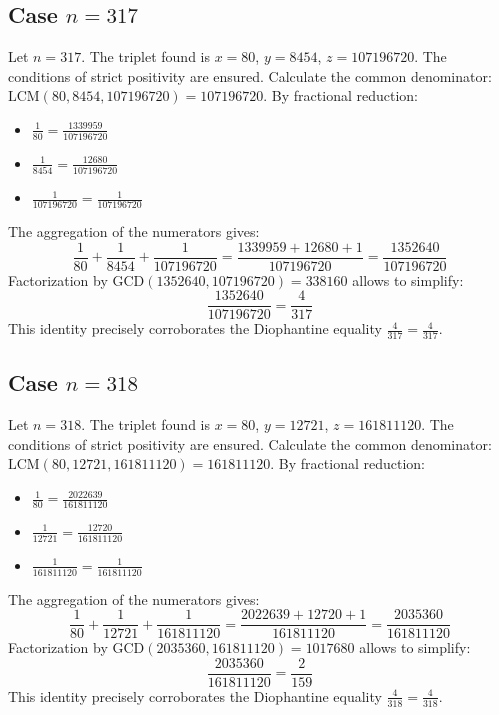 \documentclass[11pt,a4paper]{article}
\begin{document}
\subsection{Case $n = 317$}
Let $n = 317$. The triplet found is $x = 80$, $y = 8454$, $z = 107196720$.
The conditions of strict positivity are ensured.
Calculate the common denominator: $\text{LCM}(80, 8454, 107196720) = 107196720$.
By fractional reduction:
\begin{itemize}
    \item $\frac{1}{80} = \frac{1339959}{107196720}$
    \item $\frac{1}{8454} = \frac{12680}{107196720}$
    \item $\frac{1}{107196720} = \frac{1}{107196720}$
\end{itemize}
The aggregation of the numerators gives:
$$ \frac{1}{80} + \frac{1}{8454} + \frac{1}{107196720} = \frac{1339959 + 12680 + 1}{107196720} = \frac{1352640}{107196720} $$
Factorization by $\text{GCD}(1352640, 107196720) = 338160$ allows to simplify:
$$ \frac{1352640}{107196720} = \frac{4}{317} $$
This identity precisely corroborates the Diophantine equality $\frac{4}{317} = \frac{4}{317}$.

\subsection{Case $n = 318$}
Let $n = 318$. The triplet found is $x = 80$, $y = 12721$, $z = 161811120$.
The conditions of strict positivity are ensured.
Calculate the common denominator: $\text{LCM}(80, 12721, 161811120) = 161811120$.
By fractional reduction:
\begin{itemize}
    \item $\frac{1}{80} = \frac{2022639}{161811120}$
    \item $\frac{1}{12721} = \frac{12720}{161811120}$
    \item $\frac{1}{161811120} = \frac{1}{161811120}$
\end{itemize}
The aggregation of the numerators gives:
$$ \frac{1}{80} + \frac{1}{12721} + \frac{1}{161811120} = \frac{2022639 + 12720 + 1}{161811120} = \frac{2035360}{161811120} $$
Factorization by $\text{GCD}(2035360, 161811120) = 1017680$ allows to simplify:
$$ \frac{2035360}{161811120} = \frac{2}{159} $$
This identity precisely corroborates the Diophantine equality $\frac{4}{318} = \frac{4}{318}$.
\end{document}
